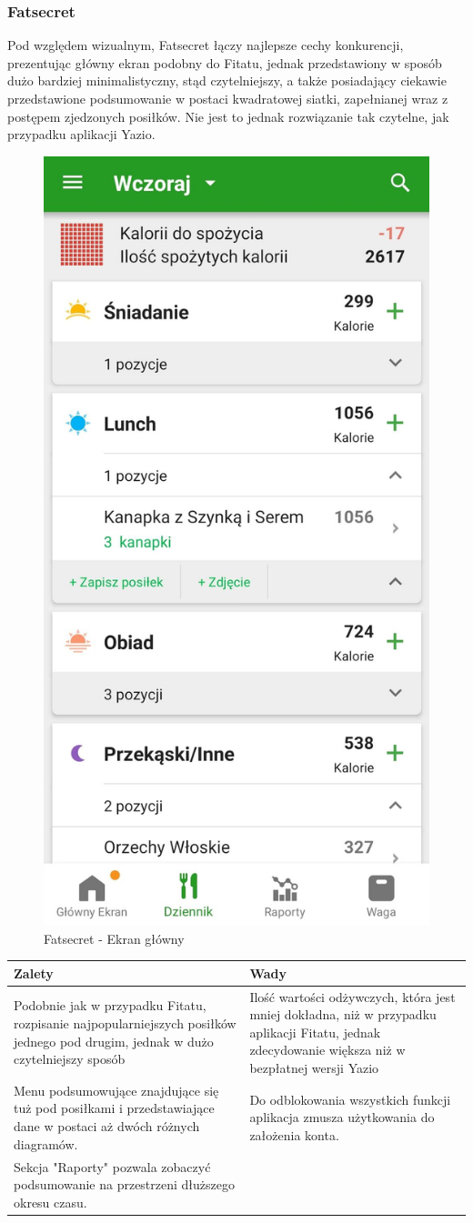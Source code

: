\documentclass[12pt, a4paper]{article}
\begin{document}
\begin{sloppypar}
{{    \subsubsection{Fatsecret}
    {
      Pod względem wizualnym, Fatsecret łączy najlepsze cechy konkurencji, prezentując
      główny ekran podobny do Fitatu, jednak przedstawiony w sposób dużo bardziej 
      minimalistyczny, stąd czytelniejszy, a także posiadający ciekawie przedstawione 
      podsumowanie w postaci kwadratowej siatki, zapełnianej wraz z postępem zjedzonych posiłków.
      Nie jest to jednak rozwiązanie tak czytelne, jak przypadku aplikacji Yazio.
      \begin{figure}[H]
        \centering
        \includegraphics[width=.3\textwidth]{fatsecret_1.png}
        \caption{Fatsecret - Ekran główny}
        \label{fig:fat1}
      \end{figure} 
      
      \begin{center}
        \begin{tabularx}{ \textwidth } {
          | >{\centering\arraybackslash}X
          | >{\centering\arraybackslash}X
          | }
         \hline
         \bfseries Zalety & \bfseries Wady \\
         \hline
         Podobnie jak w przypadku Fitatu, rozpisanie najpopularniejszych posiłków
         jednego pod drugim, jednak w dużo czytelniejszy sposób & 
         Ilość wartości odżywczych, która jest mniej dokładna, niż w przypadku aplikacji 
         Fitatu, jednak zdecydowanie większa niż w bezpłatnej wersji Yazio \\
         \hline
         Menu podsumowujące znajdujące się tuż pod posiłkami i przedstawiające dane w
         postaci aż dwóch różnych diagramów. & 
         Do odblokowania wszystkich funkcji aplikacja zmusza użytkowania do założenia
         konta. \\
         \hline
         Sekcja "Raporty" pozwala zobaczyć podsumowanie na przestrzeni dłuższego okresu
         czasu. &
          \\
         \hline
        \end{tabularx}
      \end{center}
      
}}}
\end{sloppypar}
\end{document}
